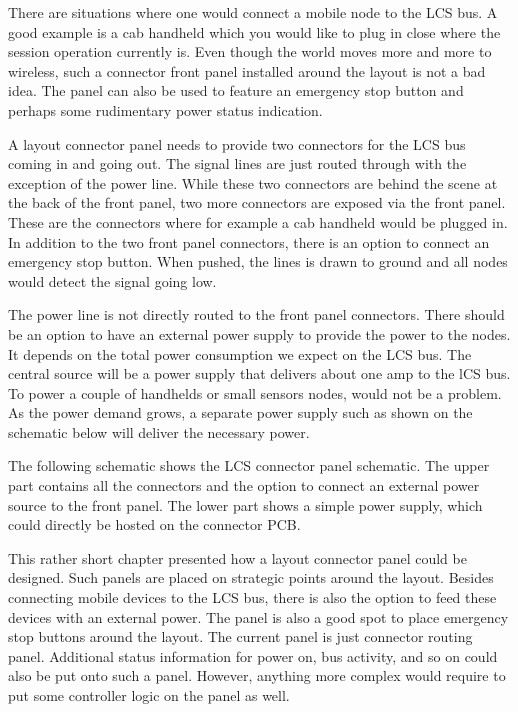 
There are situations where one would connect a mobile node to the LCS bus. A good example is a cab handheld which you would like to plug in close where the session operation currently is. Even though the world moves more and more to wireless, such a connector front panel installed around the layout is not a bad idea. The panel can also be used to feature an emergency stop button and perhaps some rudimentary power status indication.


A layout connector panel needs to provide two connectors for the LCS bus coming in and going out. The signal lines are just routed through with the exception of the power line. While these two connectors are behind the scene at the back of the front panel, two more connectors are exposed via the front panel. These are the connectors where for example a cab handheld would be plugged in. In addition to the two front panel connectors, there is an option to connect an emergency stop button. When pushed, the lines is drawn to ground and all nodes would detect the signal going low.

The power line is not directly routed to the front panel connectors. There should be an option to have an external power supply to provide the power to the nodes. It depends on the total power consumption we expect on the LCS bus. The central source will be a power supply that delivers about one amp to the lCS bus. To power a couple of handhelds or small sensors nodes, would not be a problem. As the power demand grows, a separate power supply such as shown on the schematic below will deliver the necessary power.


The following schematic shows the LCS connector panel schematic. The upper part contains all the connectors and the option to connect an external power source to the front panel. The lower part shows a simple power supply, which could directly be hosted on the connector PCB.



This rather short chapter presented how a layout connector panel could be designed. Such panels are placed on strategic points around the layout. Besides connecting mobile devices to the LCS bus, there is also the option to feed these devices with an external power.  The panel is also a good spot to place emergency stop buttons around the layout.  The current panel is just connector routing panel.  Additional status information for power on, bus activity, and so on could also be put onto such a panel. However, anything more complex would require to put some controller logic on the panel as well.

